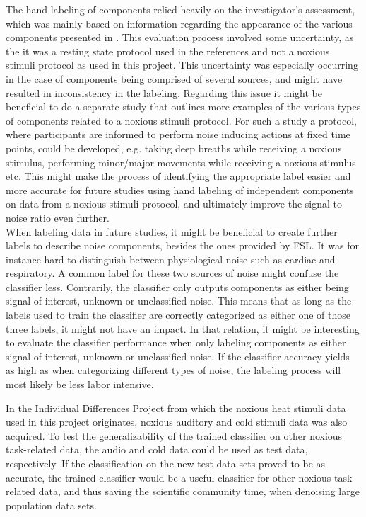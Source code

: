 The hand labeling of components relied heavily on the investigator’s assessment, which was mainly based on information regarding the appearance of the various components presented in \cite{Salimi-Khorshidi2014, Griffanti2017}. This evaluation process involved some uncertainty, as the it was a resting state protocol used in the references and not a noxious stimuli protocol as used in this project. This uncertainty was especially occurring in the case of components being comprised of several sources, and might have resulted in inconsistency in the labeling. Regarding this issue it might be beneficial to do a separate study that outlines more examples of the various types of components related to a noxious stimuli protocol. For such a study a protocol, where participants are informed to perform noise inducing actions at fixed time points, could be developed, e.g. taking deep breaths while receiving a noxious stimulus, performing minor/major movements while receiving a noxious stimulus etc. This might make the process of identifying the appropriate label easier and more accurate for future studies using hand labeling of independent components on data from a noxious stimuli protocol, and ultimately improve the signal-to-noise ratio even further. \\
When labeling data in future studies, it might be beneficial to create further labels to describe noise components, besides the ones provided by FSL. It was for instance hard to distinguish between physiological noise such as cardiac and respiratory. A common label for these two sources of noise might confuse the classifier less. Contrarily, the classifier only outputs components as either being signal of interest, unknown or unclassified noise. This means that as long as the labels used to train the classifier are correctly categorized as either one of those three labels, it might not have an impact. In that relation, it might be interesting to evaluate the classifier performance when only labeling components as either signal of interest, unknown or unclassified noise. If the classifier accuracy yields as high as when categorizing different types of noise, the labeling process will most likely be less labor intensive.

In the Individual Differences Project from which the noxious heat stimuli data used in this project originates, noxious auditory and cold stimuli data was also acquired. To test the generalizability of the trained classifier on other noxious task-related data, the audio and cold data could be used as test data, respectively. If the classification on the new test data sets proved to be as accurate, the trained classifier would be a useful classifier for other noxious task-related data, and thus saving the scientific community time, when denoising large population data sets. \\

